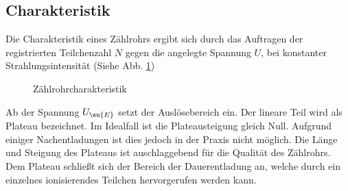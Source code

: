 \subsection{Charakteristik}
Die Charakteristik eines Zählrohrs ergibt sich durch das Auftragen der registrierten
Teilchenzahl $N$ gegen die angelegte Spannung $U$, bei konstanter Strahlungsintensität
(Siehe Abb. \ref{fig:plateau})
\begin{figure}
  \centering
  \caption{Zählrohrcharakteristik \cite{703}}
  \label{fig:plateau}
\end{figure}
Ab der Spannung $U_\su{E}$ setzt der Auslösebereich ein. Der lineare Teil wird als
Plateau bezeichnet. Im Idealfall ist die Plateausteigung gleich Null. Aufgrund
einiger Nachentladungen ist dies jedoch in der Praxis nicht möglich. Die Länge und
Steigung des Plateaus ist auschlaggebend für die Qualität des Zählrohrs. Dem Plateau
schließt sich der Bereich der Dauerentladung an, welche durch ein einzelnes ionisierendes
Teilchen hervorgerufen werden kann.

